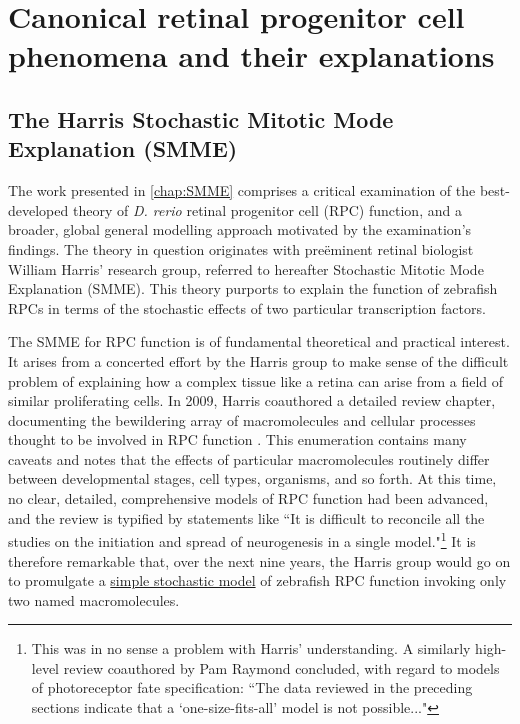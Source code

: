 \chapter{Canonical retinal progenitor cell phenomena and their explanations}
\label{chap:RPCreview}

\section{The Harris Stochastic Mitotic Mode Explanation (SMME)}
The work presented in \autoref{chap:SMME} comprises a critical examination of the best-developed theory of \textit{D. rerio} retinal progenitor cell (RPC) function, and a broader, global general modelling approach motivated by the examination's findings. The theory in question originates with pre\"{e}minent retinal biologist William Harris' research group, referred to hereafter Stochastic Mitotic Mode Explanation (SMME). This theory purports to explain the function of zebrafish RPCs in terms of the stochastic effects of two particular transcription factors.

The SMME for RPC function is of fundamental theoretical and practical interest. It arises from a concerted effort by the Harris group to make sense of the difficult problem of explaining how a complex tissue like a retina can arise from a field of similar proliferating cells. In 2009, Harris coauthored a detailed review chapter, documenting the bewildering array of macromolecules and cellular processes thought to be involved in RPC function \cite{Agathocleous2009}. This enumeration contains many caveats and notes that the effects of particular macromolecules routinely differ between developmental stages, cell types, organisms, and so forth. At this time, no clear, detailed, comprehensive models of RPC function had been advanced, and the review is typified by statements like ``It is difficult to reconcile all the studies on the initiation and spread of neurogenesis in a single model."\footnote{This was in no sense a problem with Harris' understanding. A similarly high-level review coauthored by Pam Raymond \cite{Adler2008} concluded, with regard to models of photoreceptor fate specification: ``The data reviewed in the preceding sections indicate that a ‘one-size-fits-all’ model is not possible..."} It is therefore remarkable that, over the next nine years, the Harris group would go on to promulgate a \hyperref[SSM]{simple stochastic model} of zebrafish RPC function invoking only two named macromolecules.

